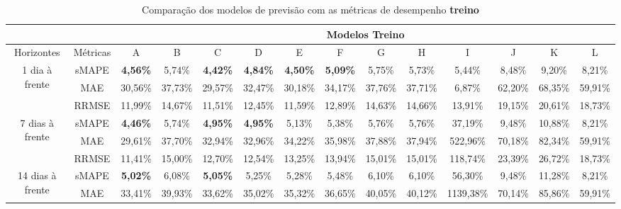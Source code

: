 \begin{landscape}
	
	\begin{table}[!htpb]
	\centering
	\caption{Comparação dos modelos de previsão com as métricas de desempenho \textbf{treino}}\label{tb:apd-trn}
	\begin{tabular}{@{}cccccccccccccc@{}}
		\toprule
		&          & \multicolumn{12}{c}{Modelos Treino}                                                                                                                             \\ \midrule
		Horizontes                        & Métricas & A               & B       & C               & D               & E               & F               & G       & H       & I         & J       & K       & L       \\ \midrule
		\multirow{3}{*}{1 dia à frente}   & sMAPE    & \textbf{4,56\%} & 5,74\%  & \textbf{4,42\%} & \textbf{4,84\%} & \textbf{4,50\%} & \textbf{5,09\%} & 5,75\%  & 5,73\%  & 5,44\%    & 8,48\%  & 9,20\%  & 8,21\%  \\
		& MAE      & 30,56\%         & 37,73\% & 29,57\%         & 32,47\%         & 30,18\%         & 34,17\%         & 37,76\% & 37,71\% & 6,87\%    & 62,20\% & 68,35\% & 59,91\% \\
		& RRMSE    & 11,99\%         & 14,67\% & 11,51\%         & 12,45\%         & 11,59\%         & 12,89\%         & 14,63\% & 14,66\% & 13,91\%   & 19,15\% & 20,61\% & 18,73\% \\ \midrule
		\multirow{3}{*}{7 dias à frente}  & sMAPE    & \textbf{4,46\%} & 5,74\%  & \textbf{4,95\%} & \textbf{4,95\%} & 5,13\%          & 5,38\%          & 5,76\%  & 5,76\%  & 37,19\%   & 9,48\%  & 10,88\% & 8,21\%  \\
		& MAE      & 29,61\%         & 37,70\% & 32,94\%         & 32,96\%         & 34,22\%         & 35,98\%         & 37,88\% & 37,94\% & 522,96\%  & 70,18\% & 82,34\% & 59,91\% \\
		& RRMSE    & 11,41\%         & 15,00\% & 12,70\%         & 12,54\%         & 13,25\%         & 13,94\%         & 15,01\% & 15,01\% & 118,74\%  & 23,39\% & 26,72\% & 18,73\% \\ \midrule
		\multirow{3}{*}{14 dias à frente} & sMAPE    & \textbf{5,02\%} & 6,08\%  & \textbf{5,05\%} & 5,25\%          & 5,28\%          & 5,48\%          & 6,10\%  & 6,10\%  & 56,30\%   & 9,48\%  & 11,28\% & 8,21\%  \\
		& MAE      & 33,41\%         & 39,93\% & 33,62\%         & 35,02\%         & 35,32\%         & 36,65\%         & 40,05\% & 40,12\% & 1139,38\% & 70,14\% & 85,86\% & 59,91\% \\

\end{tabular}
\end{table}
\end{landscape}
